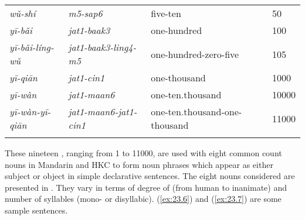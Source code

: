 \documentclass[output=paper]{langsci/langscibook}
\begin{document}
\begin{table}
{\begin{tabular}{llll}
\emph{wǔ-shí}         & \emph{m5-sap6}              & five-ten                      & 50\\
\emph{yī-bǎi}         & \emph{jat1-baak3}           & one-hundred                   & 100\\
\emph{yī-bǎi-líng-wǔ} & \emph{jat1-baak3-ling4-m5}  & one-hundred-zero-five         & 105\\
\emph{yī-qiān}        & \emph{jat1-cin1}            & one-thousand                  & 1000\\
\emph{yī-wàn}         & \emph{jat1-maan6}           & one-ten.thousand              & 10000\\
\emph{yī-wàn-yī-qiān} & \emph{jat1-maan6-jat1-cin1} & one-ten.thousand-one-thousand & 11000\\
\lspbottomrule
\end{tabular}}
\end{table}

These nineteen , ranging from 1 to 11000, are used with eight common
count nouns in Mandarin and \gls{HKC} to form noun phrases which appear as
either subject or object in simple declarative sentences. The eight nouns
considered are presented in . They vary in terms of degree
of  (from human to inanimate) and number of syllables (mono- or
disyllabic). (\ref{ex:23.6}) and (\ref{ex:23.7}) are some sample sentences.
\end{document}
